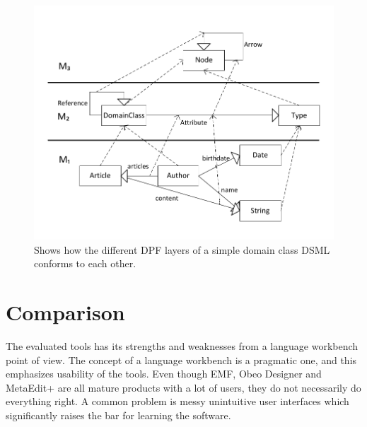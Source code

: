 \begin{figure}[htpb]
  \centering
  \centerline{\includegraphics[scale=0.8]{images/dpf_hierarchy.pdf}}
  \caption[DPF DSML example]{Shows how the different DPF layers of a simple domain class DSML conforms to each other.}
  \label{fig:dpf_hierarchy}
\end{figure}

\newpage
\section{Comparison}
The evaluated tools has its strengths and weaknesses from a language workbench point of view. The concept of a language workbench is a pragmatic one, and this emphasizes usability of the tools. Even though EMF, Obeo Designer and MetaEdit+ are all mature products with a lot of users, they do not necessarily do everything right. A common problem is messy unintuitive user interfaces which significantly raises the bar for learning the software. 

